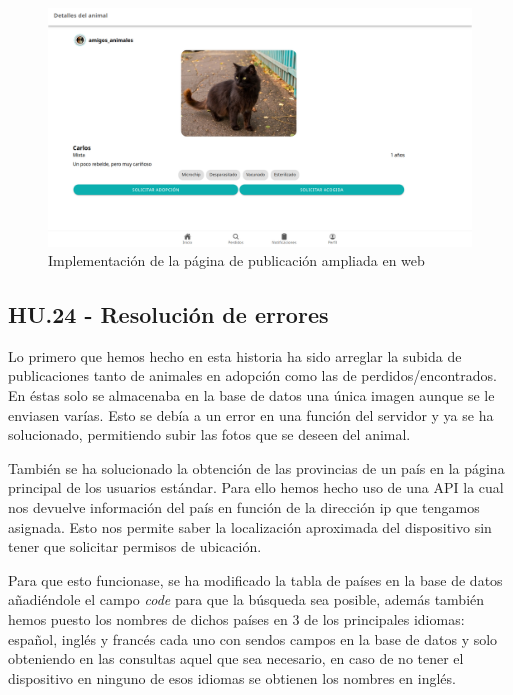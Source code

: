 \begin{figure}[H]
	\centering
	\includegraphics[width=1\linewidth]{"sprint 4/hu23/publicacionAmpliadaWeb"}
	\caption{Implementación de la página de publicación ampliada en web}
	\label{fig:publicacionampliadaweb}
\end{figure}

\subsection{HU.24 - Resolución de errores}

Lo primero que hemos hecho en esta historia ha sido arreglar la subida de publicaciones tanto de animales en adopción como las de perdidos/encontrados. En éstas solo se almacenaba en la base de datos una única imagen aunque se le enviasen varías. Esto se debía a un error en una función del servidor y ya se ha solucionado, permitiendo subir las fotos que se deseen del animal.

También se ha solucionado la obtención de las provincias de un país en la página principal de los usuarios estándar. Para ello hemos hecho uso de una API \cite{apiIp} la cual nos devuelve información del país en función de la dirección ip que tengamos asignada. Esto nos permite saber la localización aproximada del dispositivo sin tener que solicitar permisos de ubicación.

Para que esto funcionase, se ha modificado la tabla de países en la base de datos añadiéndole el campo \textit{code} para que la búsqueda sea posible, además también hemos puesto los nombres de dichos países en 3 de los principales idiomas: español, inglés y francés cada uno con sendos campos en la base de datos y solo obteniendo en las consultas aquel que sea necesario, en caso de no tener el dispositivo en ninguno de esos idiomas se obtienen los nombres en inglés. \\

